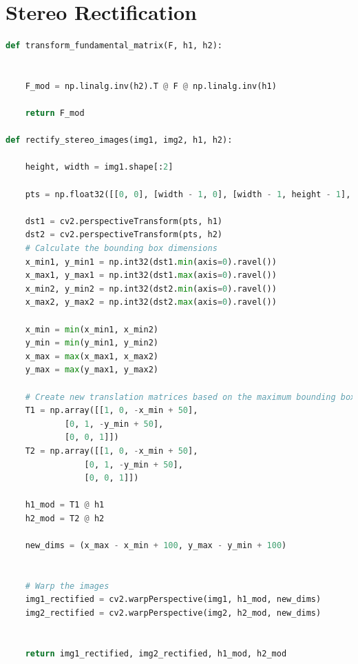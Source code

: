 \section*{Stereo Rectification}
\begin{lstlisting}[language=python]
def transform_fundamental_matrix(F, h1, h2):
    
    
    F_mod = np.linalg.inv(h2).T @ F @ np.linalg.inv(h1)
    
    return F_mod

def rectify_stereo_images(img1, img2, h1, h2):
    
    height, width = img1.shape[:2]
        
    pts = np.float32([[0, 0], [width - 1, 0], [width - 1, height - 1], [0, height - 1]]).reshape(-1, 1, 2)

    dst1 = cv2.perspectiveTransform(pts, h1)
    dst2 = cv2.perspectiveTransform(pts, h2)
    # Calculate the bounding box dimensions
    x_min1, y_min1 = np.int32(dst1.min(axis=0).ravel())
    x_max1, y_max1 = np.int32(dst1.max(axis=0).ravel())
    x_min2, y_min2 = np.int32(dst2.min(axis=0).ravel())
    x_max2, y_max2 = np.int32(dst2.max(axis=0).ravel())

    x_min = min(x_min1, x_min2)
    y_min = min(y_min1, y_min2)
    x_max = max(x_max1, x_max2)
    y_max = max(y_max1, y_max2)

    # Create new translation matrices based on the maximum bounding box
    T1 = np.array([[1, 0, -x_min + 50],
            [0, 1, -y_min + 50],
            [0, 0, 1]])
    T2 = np.array([[1, 0, -x_min + 50],
                [0, 1, -y_min + 50],
                [0, 0, 1]])

    h1_mod = T1 @ h1
    h2_mod = T2 @ h2

    new_dims = (x_max - x_min + 100, y_max - y_min + 100)


    # Warp the images
    img1_rectified = cv2.warpPerspective(img1, h1_mod, new_dims)
    img2_rectified = cv2.warpPerspective(img2, h2_mod, new_dims)


    return img1_rectified, img2_rectified, h1_mod, h2_mod
\end{lstlisting}
